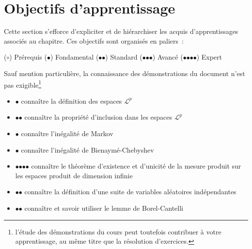 \chapter{Objectifs d'apprentissage}\label{IV-objectifs-dapprentissage}

Cette section s'efforce d'expliciter et de hiérarchiser les acquis
d'apprentissages associés au chapitre. Ces objectifs sont organisés en
paliers~:

($\mathord{\boldsymbol{\circ}}$) Prérequis ($\mathord{\bullet}$)
Fondamental ($\mathord{\bullet}\mathord{\bullet}$) Standard
($\mathord{\bullet}\mathord{\bullet}\mathord{\bullet}$) Avancé
($\mathord{\bullet}\mathord{\bullet}\mathord{\bullet}\mathord{\bullet}$)
Expert

Sauf mention particulière, la connaissance des démonstrations du
document n'est pas exigible\footnote{l'étude des démonstrations du cours
  peut toutefois contribuer à votre apprentissage, au même titre que la
  résolution d'exercices.}

\label{IV-pruxe9ambule}

\begin{itemize}
\tightlist
\item
  $\mathord{\bullet}$ connaître la définition des espaces
  \(\mathcal{L}^p\)
\item
  $\mathord{\bullet}\mathord{\bullet}$ connaître la propriété
  d'inclusion dans les espaces \(\mathcal{L}^p\)
\item
  $\mathord{\bullet}$ connaître l'inégalité de Markov
\item
  $\mathord{\bullet}$ connaître l'inégalité de Bienaymé-Chebyshev
\end{itemize}

\label{IV-suites-de-v.a.-induxe9pendantes}

\begin{itemize}
\tightlist
\item
  $\mathord{\bullet}\mathord{\bullet}\mathord{\bullet}\mathord{\bullet}$ connaître
  le théorème d'existence et d'unicité de la mesure produit sur les
  espaces produit de dimension infinie
\item
  $\mathord{\bullet}\mathord{\bullet}$ connaître la définition d'une
  suite de variables aléatoires indépendantes
\item
  $\mathord{\bullet}\mathord{\bullet}$ connaître et savoir utiliser le
  lemme de Borel-Cantelli
\end{itemize}

